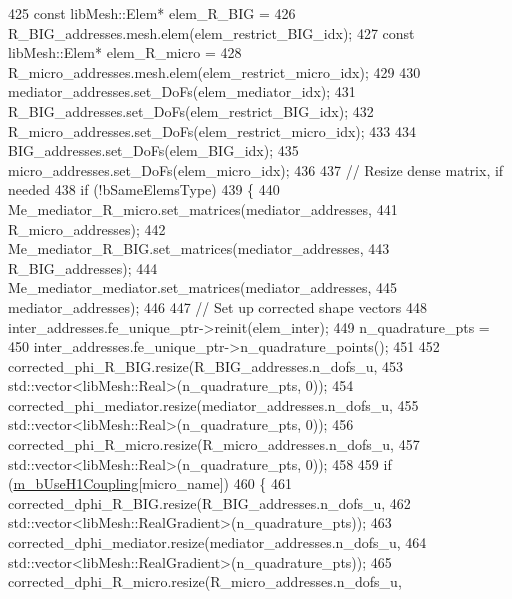 \begin{DoxyCode}
425             \textcolor{keyword}{const} libMesh::Elem* elem\_R\_BIG =
426                     R\_BIG\_addresses.mesh.elem(elem\_restrict\_BIG\_idx);
427             \textcolor{keyword}{const} libMesh::Elem* elem\_R\_micro =
428                     R\_micro\_addresses.mesh.elem(elem\_restrict\_micro\_idx);
429 
430             mediator\_addresses.set\_DoFs(elem\_mediator\_idx);
431             R\_BIG\_addresses.set\_DoFs(elem\_restrict\_BIG\_idx);
432             R\_micro\_addresses.set\_DoFs(elem\_restrict\_micro\_idx);
433 
434             BIG\_addresses.set\_DoFs(elem\_BIG\_idx);
435             micro\_addresses.set\_DoFs(elem\_micro\_idx);
436 
437             \textcolor{comment}{// Resize dense matrix, if needed}
438             \textcolor{keywordflow}{if} (!bSameElemsType)
439             \{
440                 Me\_mediator\_R\_micro.set\_matrices(mediator\_addresses,
441                         R\_micro\_addresses);
442                 Me\_mediator\_R\_BIG.set\_matrices(mediator\_addresses,
443                         R\_BIG\_addresses);
444                 Me\_mediator\_mediator.set\_matrices(mediator\_addresses,
445                         mediator\_addresses);
446 
447                 \textcolor{comment}{// Set up corrected shape vectors}
448                 inter\_addresses.fe\_unique\_ptr->reinit(elem\_inter);
449                 n\_quadrature\_pts =
450                         inter\_addresses.fe\_unique\_ptr->n\_quadrature\_points();
451 
452                 corrected\_phi\_R\_BIG.resize(R\_BIG\_addresses.n\_dofs\_u,
453                         std::vector<libMesh::Real>(n\_quadrature\_pts, 0));
454                 corrected\_phi\_mediator.resize(mediator\_addresses.n\_dofs\_u,
455                         std::vector<libMesh::Real>(n\_quadrature\_pts, 0));
456                 corrected\_phi\_R\_micro.resize(R\_micro\_addresses.n\_dofs\_u,
457                         std::vector<libMesh::Real>(n\_quadrature\_pts, 0));
458 
459                 \textcolor{keywordflow}{if} (\hyperlink{classcarl_1_1assemble__coupling__matrices_a9e3bf058bd10aacb63ebbab34fe37628}{m\_bUseH1Coupling}[micro\_name])
460                 \{
461                     corrected\_dphi\_R\_BIG.resize(R\_BIG\_addresses.n\_dofs\_u,
462                             std::vector<libMesh::RealGradient>(n\_quadrature\_pts));
463                     corrected\_dphi\_mediator.resize(mediator\_addresses.n\_dofs\_u,
464                             std::vector<libMesh::RealGradient>(n\_quadrature\_pts));
465                     corrected\_dphi\_R\_micro.resize(R\_micro\_addresses.n\_dofs\_u,

\end{DoxyCode}
